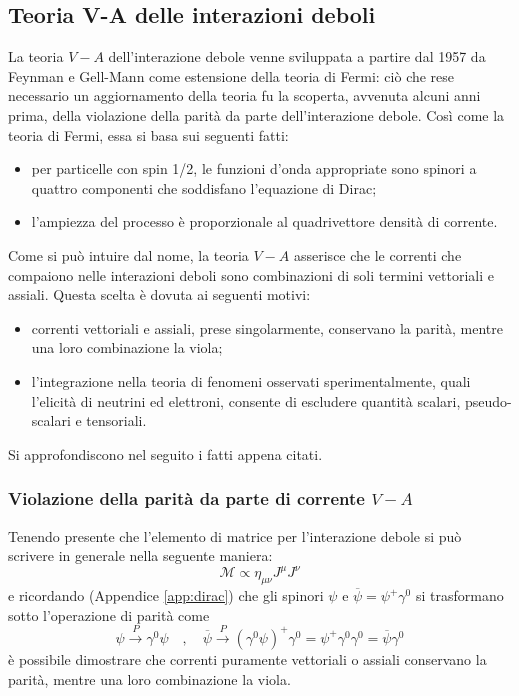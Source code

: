 \documentclass{subnucbo}
\begin{document}
\subsection{Teoria V-A delle interazioni deboli}
\label{subsec:v-a}
La teoria $V-A$ dell'interazione debole venne sviluppata a partire dal 1957 da Feynman e Gell-Mann come estensione della teoria di Fermi: ciò che rese necessario un aggiornamento della teoria fu la scoperta, avvenuta alcuni anni prima, della violazione della parità da parte dell'interazione debole. Così come la teoria di Fermi, essa si basa sui seguenti fatti:
\begin{itemize}
        \item per particelle con spin 1/2, le funzioni d'onda appropriate sono spinori a quattro componenti che soddisfano l'equazione di Dirac;
        \item l'ampiezza del processo è proporzionale al quadrivettore densità di corrente.
\end{itemize}
Come si può intuire dal nome, la teoria $V-A$ asserisce che le correnti che compaiono nelle interazioni deboli sono combinazioni di soli termini vettoriali e assiali. Questa scelta è dovuta ai seguenti motivi:
\begin{itemize}
        \item correnti vettoriali e assiali, prese singolarmente, conservano la parità, mentre una loro combinazione la viola;
        \item l'integrazione nella teoria di fenomeni osservati sperimentalmente, quali l'elicità di neutrini ed elettroni, consente di escludere quantità scalari, pseudo-scalari e tensoriali.
\end{itemize}
Si approfondiscono nel seguito i fatti appena citati.
\subsubsection{Violazione della parità da parte di corrente $V-A$}
Tenendo presente che l'elemento di matrice per l'interazione debole si può scrivere in generale nella seguente maniera:
\begin{equation}
        \mathcal{M} \propto \eta_{\mu\nu}J^{\mu}J^{\nu}
        \label{eq:weak_matrix_element}
\end{equation}
e ricordando (Appendice \ref{app:dirac}) che gli spinori $\psi$ e $\overline{\psi} = \psi ^ { + } \gamma ^ { 0 }$ si trasformano sotto l'operazione di parità come
\begin{equation}
        \psi \stackrel { P } { \rightarrow } \gamma ^ { 0 } \psi \quad,\quad \overline { \psi } \stackrel { P } { \rightarrow } \left( \gamma ^ { 0 } \psi \right) ^ { + } \gamma ^ { 0 } = \psi ^ { + } \gamma ^ { 0 } \gamma ^ { 0 } = \overline { \psi } \gamma ^ { 0 }
\end{equation}
è possibile dimostrare che correnti puramente vettoriali o assiali conservano la parità, mentre una loro combinazione la viola.
\end{document}

